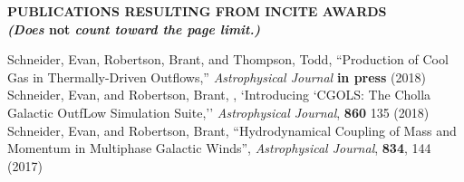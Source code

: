 \documentclass[11pt,letterpaper,english]{article}
\begin{document}
\setlength{\parindent}{0in} %


\pagestyle{fancy}   \renewcommand{%
\headrulewidth}{0.0pt}

\begin{center}
\bf {PUBLICATIONS RESULTING FROM INCITE AWARDS} \\
{\bf {\em (Does} not {\em count toward the page limit.)}}
\end{center}
\vspace{-.25in}



\leftskip 0.25in
\parindent -0.25in
{Schneider, Evan, Robertson, Brant, and Thompson, Todd, ``Production of Cool Gas in Thermally-Driven Outflows,'' {\em Astrophysical Journal} {\bf in press} (2018)}\\
{Schneider, Evan, and Robertson, Brant, , `Introducing `CGOLS: The Cholla Galactic OutfLow Simulation Suite,'' {\em Astrophysical Journal}, {\bf 860} 135 (2018) } \\
{Schneider, Evan, and Robertson, Brant, ``Hydrodynamical Coupling of Mass and Momentum in Multiphase Galactic Winds'', {\em Astrophysical Journal}, {\bf 834}, 144 (2017)} \\
\end{document}
